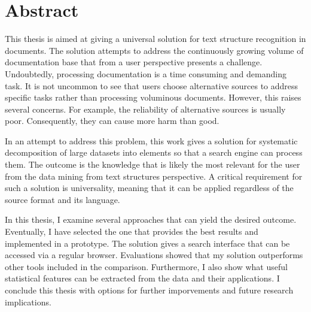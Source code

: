 \chapter*{Abstract}





This thesis is aimed at giving a universal solution for text structure recognition in documents. The solution attempts to address the continuously growing volume of documentation base that from a user perspective presents a challenge. Undoubtedly, processing documentation is a time consuming and demanding task. It is not uncommon to see that users choose alternative sources to address specific tasks rather than processing voluminous documents. However, this raises several concerns. For example, the reliability of alternative sources is usually poor. Consequently, they can cause more harm than good.

In an attempt to address this problem, this work gives a solution for systematic decomposition of large datasets into elements so that a search engine can process them. The outcome is the knowledge that is likely the most relevant for the user from the data mining from text structures perspective. A critical requirement for such a solution is universality, meaning that it can be applied regardless of the source format and its language. 

In this thesis, I examine several approaches that can yield the desired outcome. Eventually, I have selected the one that provides the best results and implemented in a prototype. The solution gives a search interface that can be accessed via a regular browser. Evaluations showed that my solution outperforms other tools included in the comparison. Furthermore, I also show what useful statistical features can be extracted from the data and their applications. I conclude this thesis with options for further imporvements and future research implications.